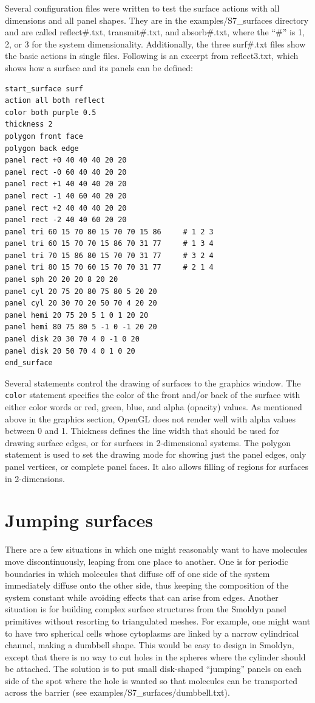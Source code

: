 \documentclass {scrbook}
\newcommand {\ttt} {\texttt}
\begin{document}
Several configuration files were written to test the surface actions with all dimensions and all panel shapes. They are in the examples/S7\_surfaces directory and are called reflect\#.txt, transmit\#.txt, and absorb\#.txt, where the ``\#'' is 1, 2, or 3 for the system dimensionality. Additionally, the three surf\#.txt files show the basic actions in single files. Following is an excerpt from reflect3.txt, which shows how a surface and its panels can be defined:

\begin{lstlisting}[style=SSAC]
start_surface surf
action all both reflect
color both purple 0.5
thickness 2
polygon front face
polygon back edge
panel rect +0 40 40 40 20 20
panel rect -0 60 40 40 20 20
panel rect +1 40 40 40 20 20
panel rect -1 40 60 40 20 20
panel rect +2 40 40 40 20 20
panel rect -2 40 40 60 20 20
panel tri 60 15 70 80 15 70 70 15 86     # 1 2 3
panel tri 60 15 70 70 15 86 70 31 77     # 1 3 4
panel tri 70 15 86 80 15 70 70 31 77     # 3 2 4
panel tri 80 15 70 60 15 70 70 31 77     # 2 1 4
panel sph 20 20 20 8 20 20
panel cyl 20 75 20 80 75 80 5 20 20
panel cyl 20 30 70 20 50 70 4 20 20
panel hemi 20 75 20 5 1 0 1 20 20
panel hemi 80 75 80 5 -1 0 -1 20 20
panel disk 20 30 70 4 0 -1 0 20
panel disk 20 50 70 4 0 1 0 20
end_surface
\end{lstlisting}

Several statements control the drawing of surfaces to the graphics window. The \ttt{color} statement specifies the color of the front and/or back of the surface with either color words or red, green, blue, and alpha (opacity) values. As mentioned above in the graphics section, OpenGL does not render well with alpha values between 0 and 1. Thickness defines the line width that should be used for drawing surface edges, or for surfaces in 2-dimensional systems. The polygon statement is used to set the drawing mode for showing just the panel edges, only panel vertices, or complete panel faces. It also allows filling of regions for surfaces in 2-dimensions.

\section{Jumping surfaces}

There are a few situations in which one might reasonably want to have molecules move discontinuously, leaping from one place to another. One is for periodic boundaries in which molecules that diffuse off of one side of the system immediately diffuse onto the other side, thus keeping the composition of the system constant while avoiding effects that can arise from edges. Another situation is for building complex surface structures from the Smoldyn panel primitives without resorting to triangulated meshes. For example, one might want to have two spherical cells whose cytoplasms are linked by a narrow cylindrical channel, making a dumbbell shape. This would be easy to design in Smoldyn, except that there is no way to cut holes in the spheres where the cylinder should be attached. The solution is to put small disk-shaped ``jumping'' panels on each side of the spot where the hole is wanted so that molecules can be transported across the barrier (see examples/S7\_surfaces/dumbbell.txt).
\end{document}
